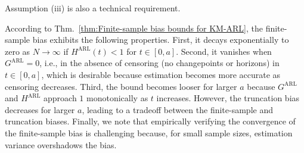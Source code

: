\documentclass{article}
\theoremstyle{plain}
\theoremstyle{definition}
\theoremstyle{remark}
\begin{document}
Assumption (iii) is also a technical requirement.

According to Thm.~\ref{thm:Finite-sample bias bounds for KM-ARL}, the finite-sample bias exhibits the following properties. 
First, it decays exponentially to zero as $N \rightarrow \infty$ if $H^\mathrm{ARL}(t) < 1$ for $t \in [0,a]$.
Second, it vanishes when $G^\mathrm{ARL} = 0$, i.e., in the absence of censoring (no changepoints or horizons) in $t \in [0, a]$, which is desirable because estimation becomes more accurate as censoring decreases.
Third, the bound becomes looser for larger $a$ because $G^\mathrm{ARL}$ and $H^\mathrm{ARL}$ approach $1$ monotonically as $t$ increases.
However, the truncation bias decreases for larger $a$, leading to a tradeoff between the finite-sample and truncation biases.
Finally, we note that empirically verifying the convergence of the finite-sample bias is challenging because, for small sample sizes, estimation variance overshadows the bias.
\end{document}
